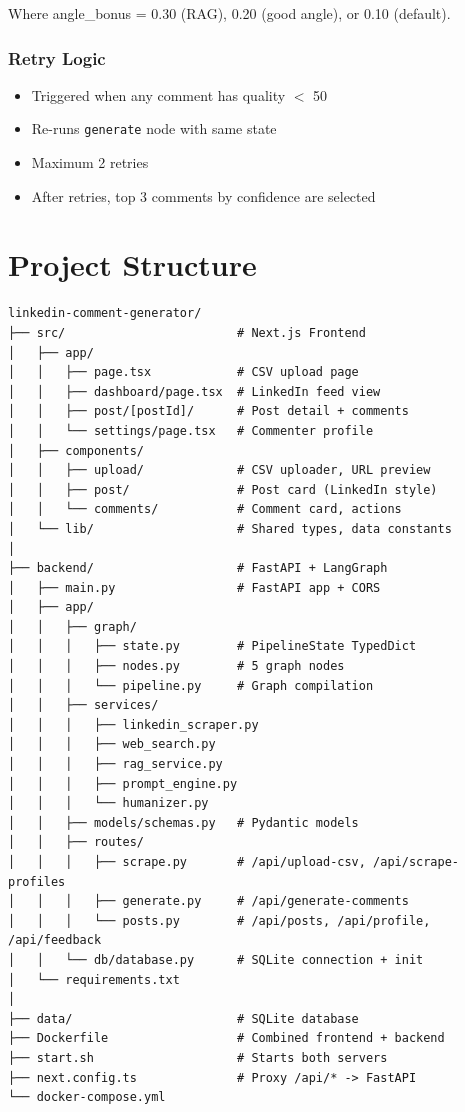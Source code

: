 \documentclass[12pt,a4paper]{article}
\begin{document}
Where angle\_bonus = 0.30 (RAG), 0.20 (good angle), or 0.10 (default).

\subsubsection{Retry Logic}
\begin{itemize}[leftmargin=1.5em]
    \item Triggered when any comment has quality $<$ 50
    \item Re-runs \texttt{generate} node with same state
    \item Maximum 2 retries
    \item After retries, top 3 comments by confidence are selected
\end{itemize}

\section{Project Structure}

\begin{lstlisting}
linkedin-comment-generator/
├── src/                        # Next.js Frontend
│   ├── app/
│   │   ├── page.tsx            # CSV upload page
│   │   ├── dashboard/page.tsx  # LinkedIn feed view
│   │   ├── post/[postId]/      # Post detail + comments
│   │   └── settings/page.tsx   # Commenter profile
│   ├── components/
│   │   ├── upload/             # CSV uploader, URL preview
│   │   ├── post/               # Post card (LinkedIn style)
│   │   └── comments/           # Comment card, actions
│   └── lib/                    # Shared types, data constants
│
├── backend/                    # FastAPI + LangGraph
│   ├── main.py                 # FastAPI app + CORS
│   ├── app/
│   │   ├── graph/
│   │   │   ├── state.py        # PipelineState TypedDict
│   │   │   ├── nodes.py        # 5 graph nodes
│   │   │   └── pipeline.py     # Graph compilation
│   │   ├── services/
│   │   │   ├── linkedin_scraper.py
│   │   │   ├── web_search.py
│   │   │   ├── rag_service.py
│   │   │   ├── prompt_engine.py
│   │   │   └── humanizer.py
│   │   ├── models/schemas.py   # Pydantic models
│   │   ├── routes/
│   │   │   ├── scrape.py       # /api/upload-csv, /api/scrape-profiles
│   │   │   ├── generate.py     # /api/generate-comments
│   │   │   └── posts.py        # /api/posts, /api/profile, /api/feedback
│   │   └── db/database.py      # SQLite connection + init
│   └── requirements.txt
│
├── data/                       # SQLite database
├── Dockerfile                  # Combined frontend + backend
├── start.sh                    # Starts both servers
├── next.config.ts              # Proxy /api/* -> FastAPI
└── docker-compose.yml
\end{lstlisting}
\end{document}
